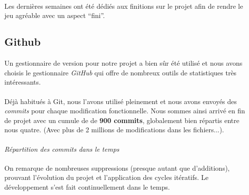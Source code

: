 \paragraph{}
Les dernières semaines ont été dédiés aux finitions sur le projet afin de rendre le jeu agréable avec un aspect “fini”.

\subsection{Github}

\paragraph{}
Un gestionnaire de version pour notre projet a bien sûr été utilisé et nous avons choisis le gestionnaire \emph{GitHub} qui offre de nombreux outils de statistiques très intéressants.

\paragraph{}
Déjà habitués à Git, nous l'avons utilisé pleinement et nous avons envoyés des \emph{commits} pour chaque modification fonctionnelle. Nous sommes ainsi arrivé en fin de projet avec un cumule de de \textbf{900 commits}, globalement bien répartis entre nous quatre. (Avec plus de 2 millions de modifications dans les fichiers...).

\paragraph{}
\noindent
{}
\begin{center}
\textit{Répartition des commits dans le temps}
\end{center}

\paragraph{}
On remarque de nombreuses suppressions (presque autant que d’additions), prouvant l’évolution du projet et l’application des cycles itératifs. Le développement s’est fait continuellement dans le temps.

